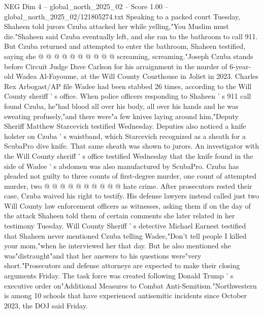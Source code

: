 \begin{textsample}{NEG Dim 4 – global\_north\_2025\_02 – Score 1.00 – global\_north\_2025\_02/121805274.txt}
Speaking to a packed court Tuesday, Shaheen told jurors Czuba attacked her while yelling,"You Muslim must die."Shaheen said Czuba eventually left, and she ran to the bathroom to call 911.
But Czuba returned and attempted to enter the bathroom, Shaheen testified, saying she @ @ @ @ @ @ @ @ @ @ screaming, screaming."Joseph Czuba stands before Circuit Judge Dave Carlson for his arraignment in the murder of 6-year-old Wadea Al-Fayoume, at the Will County Courthouse in Joliet in 2023.
Charles Rex Arbogast/AP file Wadee had been stabbed 26 times, according to the Will County sheriff ' s office.
When police officers responding to Shaheen ' s 911 call found Czuba, he"had blood all over his body, all over his hands and he was sweating profusely,"and there were"a few knives laying around him,"Deputy Sheriff Matthew Starcevich testified Wednesday.
Deputies also noticed a knife holster on Czuba ' s waistband, which Starcevich recognized as a sheath for a ScubaPro dive knife.
That same sheath was shown to jurors.
An investigator with the Will County sheriff ' s office testified Wednesday that the knife found in the side of Wadee ' s abdomen was also manufactured by ScubaPro.
Czuba has pleaded not guilty to three counts of first-degree murder, one count of attempted murder, two @ @ @ @ @ @ @ @ @ @ hate crime.
After prosecutors rested their case, Czuba waived his right to testify.
His defense lawyers instead called just two Will County law enforcement officers as witnesses, asking them if on the day of the attack Shaheen told them of certain comments she later related in her testimony Tuesday.
Will County Sheriff ' s detective Michael Earnest testified that Shaheen never mentioned Czuba telling Wadee,"Don't tell people I killed your mom,"when he interviewed her that day.
But he also mentioned she was"distraught"and that her answers to his questions were"very short."Prosecutors and defense attorneys are expected to make their closing arguments Friday.
The task force was created following Donald Trump ' s executive order on"Additional Measures to Combat Anti-Semitism."Northwestern is among 10 schools that have experienced antisemitic incidents since October 2023, the DOJ said Friday.

\end{textsample}
